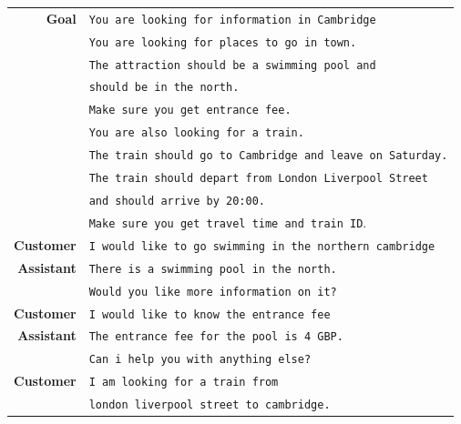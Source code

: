 \begin{table}[tp]
    \centering
    \begin{tabular}{r|l}
    \toprule
        \textbf{Goal} & \texttt{You are looking for information in Cambridge }\\
        & \texttt{You are looking for places to go in town.} \\
        & \texttt{The attraction should be a {\color{cyan!80!yellow!80!black!100 }swimming pool} and } \\
        & \texttt{should be {\color{cyan!80!yellow!80!black!100 }in the north.} }\\
        & \texttt{Make sure you get {\color{orange!50!yellow!90!black!100!}entrance fee.}}\\
        & \texttt{You are also looking for a train.}\\
        & \texttt{The train should go to {\color{cyan!80!yellow!80!black!100 }Cambridge} and {\color{cyan!80!yellow!80!black!100 }leave on Saturday.}}\\
        & \texttt{The train should depart from {\color{cyan!80!yellow!80!black!100 }London Liverpool Street}}\\
        & \texttt{and should {\color{cyan!80!yellow!80!black!100 }arrive by 20:00.}} \\
        & \texttt{Make sure you get {\color{orange!50!yellow!90!black!100!}travel time} and {\color{orange!50!yellow!90!black!100!}train ID}}.\\
        \midrule
        \textbf{Customer} & \texttt{I would like to {\color{cyan!80!yellow!80!black!100 }go swimming} in the {\color{cyan!80!yellow!80!black!100 }northern} cambridge}\\
        \textbf{Assistant} & \texttt{There is a swimming pool in the north.} \\
        & \texttt{Would you like more information on it?} \\
        \textbf{Customer} &\texttt{I would like to know the {\color{orange!50!yellow!90!black!100!}entrance fee}} \\
        \textbf{Assistant} & \texttt{The entrance fee for the pool is {\color{orange!50!yellow!90!black!100!}4 GBP}.} \\
        & \texttt{Can i help you with anything else?}\\
        \textbf{Customer} & \texttt{I am looking for a train from} \\
        & \texttt{{\color{cyan!80!yellow!80!black!100 }london liverpool street} to {\color{cyan!80!yellow!80!black!100 }cambridge}.} \\

\end{tabular}
\end{table}
